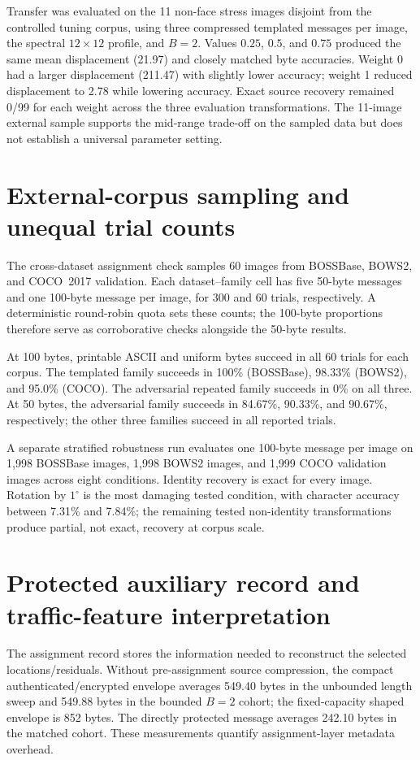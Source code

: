 ﻿\documentclass[11pt,a4paper]{article}
\begin{document}
Transfer was evaluated on the 11 non-face stress images disjoint from the
controlled tuning corpus, using three compressed templated messages per image,
the spectral $12\times12$ profile, and $B=2$. Values $0.25$, $0.5$, and
$0.75$ produced the same mean displacement (21.97) and closely matched byte
accuracies. Weight 0 had a larger displacement (211.47) with slightly lower
accuracy; weight 1 reduced displacement to 2.78 while lowering accuracy.
Exact source recovery remained 0/99 for each weight across the three
evaluation transformations. The 11-image external sample supports the
mid-range trade-off on the sampled data but does not establish a universal
parameter setting.

\begin{table}[h]
\centering
\small
\caption{Stability-Weight Transfer on the Scene Holdout}
\resizebox{\linewidth}{!}{}
\end{table}

\section{External-corpus sampling and unequal trial counts}
The cross-dataset assignment check samples 60 images from BOSSBase, BOWS2, and COCO~2017 validation. Each dataset--family cell has five 50-byte messages and one 100-byte message per image, for 300 and 60 trials, respectively. A deterministic round-robin quota sets these counts; the 100-byte proportions therefore serve as corroborative checks alongside the 50-byte results.

At 100 bytes, printable ASCII and uniform bytes succeed in all 60 trials for each corpus. The templated family succeeds in 100\% (BOSSBase), 98.33\% (BOWS2), and 95.0\% (COCO). The adversarial repeated family succeeds in 0\% on all three. At 50 bytes, the adversarial family succeeds in 84.67\%, 90.33\%, and 90.67\%, respectively; the other three families succeed in all reported trials.

A separate stratified robustness run evaluates one 100-byte message per image on 1,998 BOSSBase images, 1,998 BOWS2 images, and 1,999 COCO validation images across eight conditions. Identity recovery is exact for every image. Rotation by $1^\circ$ is the most damaging tested condition, with character accuracy between 7.31\% and 7.84\%; the remaining tested non-identity transformations produce partial, not exact, recovery at corpus scale.

\section{Protected auxiliary record and traffic-feature interpretation}
The assignment record stores the information needed to reconstruct the selected locations/residuals. Without pre-assignment source compression, the compact authenticated/encrypted envelope averages 549.40 bytes in the unbounded length sweep and 549.88 bytes in the bounded $B=2$ cohort; the fixed-capacity shaped envelope is 852 bytes. The directly protected message averages 242.10 bytes in the matched cohort. These measurements quantify assignment-layer metadata overhead.
\end{document}
